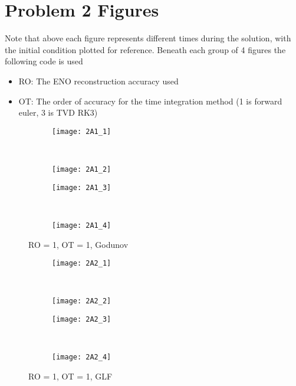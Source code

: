 \documentclass[10pt,letterpaper,fleqn]{article}
\begin{document}
\newpage
\section{Problem 2 Figures}\label{app:FVM}
Note that above each figure represents different times during the solution,
with the initial condition plotted for reference.
Beneath each group of 4 figures the following code is used
\begin{itemize}
	\item RO: The ENO reconstruction accuracy used
	\item OT: The order of accuracy for the time integration method (1 is forward euler, 3 is TVD RK3)
\end{itemize}

\begin{figure}[h!]
        \centering
        \begin{subfigure}[b]{0.4\textwidth}
                \texttt{[image: 2A1\_1]}
        \end{subfigure}%
        ~ 
        \begin{subfigure}[b]{0.4\textwidth}
                \texttt{[image: 2A1\_2]}
        \end{subfigure}
        
        \begin{subfigure}[b]{0.4\textwidth}
                \texttt{[image: 2A1\_3]}
        \end{subfigure}
        ~
        \begin{subfigure}[b]{0.4\textwidth}
                \texttt{[image: 2A1\_4]}
        \end{subfigure}
        \caption{RO = 1, OT = 1, Godunov}
\end{figure}

\begin{figure}[h!]
        \centering
        \begin{subfigure}[b]{0.4\textwidth}
                \texttt{[image: 2A2\_1]}
        \end{subfigure}%
        ~ 
        \begin{subfigure}[b]{0.4\textwidth}
                \texttt{[image: 2A2\_2]}
        \end{subfigure}
        
        \begin{subfigure}[b]{0.4\textwidth}
                \texttt{[image: 2A2\_3]}
        \end{subfigure}
        ~
        \begin{subfigure}[b]{0.4\textwidth}
                \texttt{[image: 2A2\_4]}
        \end{subfigure}
        \caption{RO = 1, OT = 1, GLF}
\end{figure}
\end{document}
